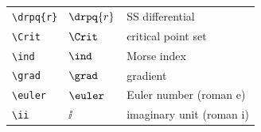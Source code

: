 \begin{longtable}{@{} p{4cm} p{5cm} p{5cm} @{}}
	\texttt{\textbackslash drpq\{r\}}   & $\drpq{r}$        & SS differential \\
	\texttt{\textbackslash Crit}        & $\Crit$           & critical point set \\
	\texttt{\textbackslash ind}         & $\ind$            & Morse index \\
	\texttt{\textbackslash grad}        & $\grad$           & gradient \\
	\texttt{\textbackslash euler}       & $\euler$          & Euler number (roman e) \\
	\texttt{\textbackslash ii}          & $\ii$             & imaginary unit (roman i) \\
	\bottomrule
\end{longtable}